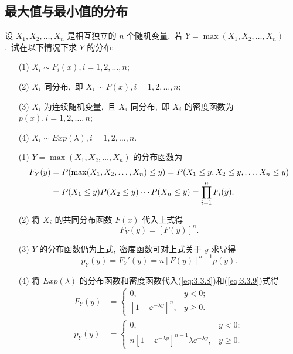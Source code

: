    \subsection{最大值与最小值的分布}\label{ssec:3.3.2}
   \begin{example}[最大值分布]\label{exam:3.3.4}
   	设 $X_1,X_2,\ldots,X_n$ 是相互独立的 $n$ 个随机变量,\ 若 $Y=\max(X_1,X_2,\ldots,X_n)$ .\ 试在以下情况下求 $Y$ 的分布:
   	\begin{itemize}
   		\item[(1)] $X_i\sim F_i(x),i=1,2,\ldots,n$;
   		\item[(2)] $X_i$ 同分布,\ 即 $X_i\sim F(x),i=1,2,\ldots,n$;
   		\item[(3)] $X_i$ 为连续随机变量,\ 且 $X_i$ 同分布,\ 即 $X_i$ 的密度函数为 $p(x),i=1,2,\ldots,n$;
   		\item[(4)] $X_i\sim Exp(\lambda),i=1,2,\ldots,n$.
   	\end{itemize}
   	\begin{solution}
   		\begin{itemize}
   			\item[(1)] $Y=\max(X_1,X_2,\ldots,X_n)$ 的分布函数为
   			\begin{align}
   				F_Y(y)
   				&=P(\max(X_1,X_2,\ldots,X_n)\leqslant y)=P(X_1\leqslant y,X_2\leqslant y,\ldots,X_n\leqslant y)\notag\\
   				&=P(X_1\leqslant y)P(X_2\leqslant y)\cdots P(X_n\leqslant y)=\prod_{i=1}^{n}F_i(y).\label{eq:3.3.7}
   			\end{align}
   			\item[(2)] 将 $X_i$ 的共同分布函数 $F(x)$ 代入上式得
   			\begin{equation}
   				F_Y(y)=[F(y)]^n.\label{eq:3.3.8}
   			\end{equation}
   			\item[(3)] $Y$ 的分布函数仍为上式,\ 密度函数可对上式关于 $y$ 求导得
   			\begin{equation}
   				p_Y(y)=F_{Y}'(y)=n[F(y)]^{n-1}p(y).\label{eq:3.3.9}
   			\end{equation}
   			\item[(4)] 将 $Exp(\lambda)$ 的分布函数和密度函数代入(\ref{eq:3.3.8})和(\ref{eq:3.3.9})式得
   			\begin{align*}
   				F_Y(y) &= \begin{cases}
   					0, & y<0;\\
   					[1-\ee^{-\lambda y}]^n, & y\geqslant0.
   				\end{cases}\\
   				p_Y(y) &= \begin{cases}
   					0, & y<0;\\
   					n[1-\ee^{-\lambda y}]^{n-1}\lambda\ee^{-\lambda y}, & y\geqslant0.
   				\end{cases}
   			\end{align*}
   		\end{itemize}
   	\end{solution}
   \end{example}
